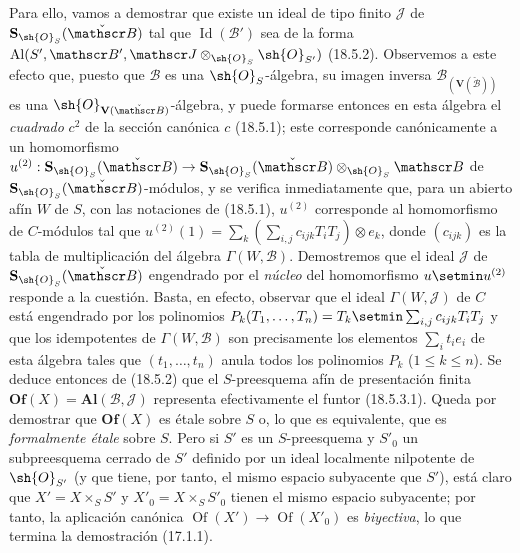 Para ello, vamos a demostrar que existe un ideal de tipo finito $\mathscr J$ de $\mathbf S_{\sh{O}_S}(\check{\mathscr B})$ tal que $\operatorname{Id}(\mathscr B')$ sea de la forma $\operatorname{Al}(S',\mathscr B',\mathscr J\otimes_{\sh{O}_S}\sh{O}_{S'})$ (18.5.2). Observemos a este efecto que, puesto que $\mathscr B$ es una $\sh{O}_S$-álgebra, su imagen inversa $\mathscr B_{(\mathbf V(\check{\mathscr B}))}$ es una $\sh{O}_{\mathbf V(\check{\mathscr B})}$-álgebra, y puede formarse entonces en esta álgebra el \emph{cuadrado} $c^2$ de la sección canónica $c$ (18.5.1); este corresponde canónicamente a un homomorfismo $u^{(2)}:\mathbf S_{\sh{O}_S}(\check{\mathscr B})\to\mathbf S_{\sh{O}_S}(\check{\mathscr B})\otimes_{\sh{O}_S}\mathscr B$ de $\mathbf S_{\sh{O}_S}(\check{\mathscr B})$-módulos, y se verifica inmediatamente que, para un abierto afín $W$ de $S$, con las notaciones de (18.5.1), $u^{(2)}$ corresponde al homomorfismo de $C$-módulos tal que
$u^{(2)}(1)=\sum_k(\sum_{i,j}c_{ijk}T_iT_j)\otimes e_k$,
donde $(c_{ijk})$ es la tabla de multiplicación del álgebra $\Gamma(W,\mathscr B)$. Demostremos que el ideal $\mathscr J$ de $\mathbf S_{\sh{O}_S}(\check{\mathscr B})$ engendrado por el \emph{núcleo} del homomorfismo $u\setmin u^{(2)}$ responde a la cuestión. Basta, en efecto, observar que el ideal $\Gamma(W,\mathscr J)$ de $C$ está engendrado por los polinomios $P_k(T_1,\ldots,T_n)=T_k\setmin\sum_{i,j}c_{ijk}T_iT_j$ y que los idempotentes de $\Gamma(W,\mathscr B)$ son precisamente los elementos $\sum_i t_i e_i$ de esta álgebra tales que $(t_1,\ldots,t_n)$ anula todos los polinomios $P_k$ ($1\leq k\leq n$). Se deduce entonces de (18.5.2) que el $S$-preesquema afín de presentación finita $\mathbf{Of}(X)=\mathbf{Al}(\mathscr B,\mathscr J)$ representa efectivamente el funtor (18.5.3.1). Queda por demostrar que $\mathbf{Of}(X)$ es étale sobre $S$ o, lo que es equivalente, que es \emph{formalmente étale} sobre $S$. Pero si $S'$ es un $S$-preesquema y $S'_0$ un subpreesquema cerrado de $S'$ definido por un ideal localmente nilpotente de $\sh{O}_{S'}$ (y que tiene, por tanto, el mismo espacio subyacente que $S'$), está claro que $X'=X\times_S S'$ y $X'_0=X\times_S S'_0$ tienen el mismo espacio subyacente; por tanto, la aplicación canónica $\operatorname{Of}(X')\to\operatorname{Of}(X'_0)$ es \emph{biyectiva}, lo que termina la demostración (17.1.1).

